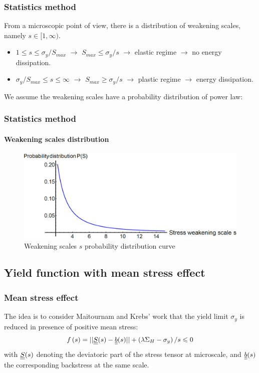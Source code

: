 \documentclass[xcolor=table]{Bredelebeamer}
\begin{document}
\begin{frame}
	\frametitle{Statistics method}	
From a microscopic point of view, there is a distribution of weakening scales, namely $s\in[1,\infty)$.
	
	\vspace{6pt}
	\begin{itemize}	
\item	$1\leqslant s\leqslant \sigma_y/S_{max}$ $\longrightarrow$ $S_{max}\leqslant \sigma_y/s$ $\longrightarrow$ elastic regime $\longrightarrow$ no energy dissipation.

\vspace{6pt}		
\item	$\sigma_y/S_{max}\leqslant s\leqslant \infty$ $\longrightarrow$ $S_{max}\geqslant \sigma_y/s$ $\longrightarrow$ plastic regime $\longrightarrow$  energy dissipation.
\end{itemize}
	\vspace{6pt}
	We assume the weakening scales have a probability distribution of power law: 
	
\end{frame}	



\begin{frame}
	\frametitle{Statistics method}	
	\framesubtitle{Weakening scales distribution}	
	
	\begin{figure}[h!]
		\centering
		\includegraphics[width=\textwidth]{figures//ps.png} 
		\caption{Weakening scales $s$ probability distribution curve}
		\label{ps}
	\end{figure}
\end{frame}	

\subsection{Yield function with mean stress effect}

\begin{frame}
	\frametitle{Mean stress effect}	
The idea is to consider Maitournam and Krebs' work that the yield limit $\sigma_y$ is reduced in presence of positive mean stress:
\begin{equation}
f\left(s\right)=||\uline{\uline{S}}(s)-\uline{\uline{b}}(s)||+\left( \lambda \Sigma_H-\sigma_y\right) /s\leqslant 0
\label{yieldfun}
\end{equation}
with $\uline{\uline{S}}(s)$ denoting the deviatoric part of the stress tensor at microscale, and $\uline{\uline{b}}(s)$ the corresponding backstress at the same scale.
\end{frame}	
\end{document}
